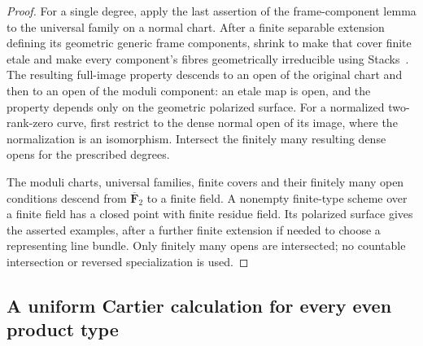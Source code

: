 \begin{proof}
For a single degree, apply the last assertion of the
frame-component lemma to the universal family on a
normal chart. After a finite separable extension defining
its geometric generic frame components, shrink to make
that cover finite etale and make every component's fibres
geometrically irreducible using Stacks~\cite{Stacks0559}.
The resulting full-image property descends to an open
of the original chart and then to an open of the moduli
component: an etale map is open, and the property depends
only on the geometric polarized surface. For a normalized
two-rank-zero curve, first restrict to the dense normal
open of its image, where the normalization is an
isomorphism. Intersect the finitely many resulting dense
opens for the prescribed degrees.

The moduli charts, universal families, finite covers and
their finitely many open conditions descend from
$\overline{\mathbf F}_2$ to a finite field. A nonempty
finite-type scheme over a finite field has a closed
point with finite residue field. Its polarized surface
gives the asserted examples, after a further finite
extension if needed to choose a representing line bundle.
Only finitely many opens are intersected; no countable
intersection or reversed specialization is used.
\end{proof}




\subsection{A uniform Cartier calculation for every even product type}
\label{sec:DE-A3-all-ss-rectangles}

